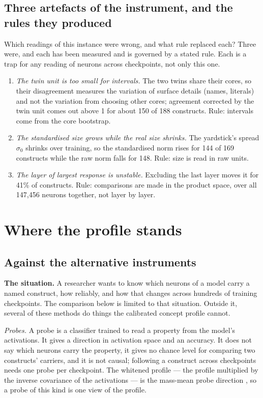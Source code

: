 \documentclass{article}
\begin{document}
\subsection{Three artefacts of the instrument, and the rules they produced}

Which readings of this instance were wrong, and what rule replaced each? Three were, and each has been measured and is governed by a stated rule. Each is a trap for any reading of neurons across checkpoints, not only this one.
\begin{enumerate}[topsep=2pt,itemsep=1pt,parsep=0pt,partopsep=0pt,leftmargin=*]
\item \emph{The twin unit is too small for intervals.} The two twins share their cores, so their disagreement measures the variation of surface details (names, literals) and not the variation from choosing other cores; agreement corrected by the twin unit comes out above 1 for about 150 of 188 constructs. Rule: intervals come from the core bootstrap.
\item \emph{The standardised size grows while the real size shrinks.} The yardstick's spread $\sigma$$_0$ shrinks over training, so the standardised norm rises for 144 of 169 constructs while the raw norm falls for 148. Rule: size is read in raw units.
\item \emph{The layer of largest response is unstable.} Excluding the last layer moves it for 41\% of constructs. Rule: comparisons are made in the product space, over all 147,456 neurons together, not layer by layer.
\end{enumerate}

\section{Where the profile stands}

\subsection{Against the alternative instruments}

\textbf{The situation.} A researcher wants to know which neurons of a model carry a named construct, how reliably, and how that changes across hundreds of training checkpoints. The comparison below is limited to that situation. Outside it, several of these methods do things the calibrated concept profile cannot.

\emph{Probes.} A probe is a classifier trained to read a property from the model's activations. It gives a direction in activation space and an accuracy. It does not say which neurons carry the property, it gives no chance level for comparing two constructs' carriers, and it is not causal; following a construct across checkpoints needs one probe per checkpoint. The whitened profile --- the profile multiplied by the inverse covariance of the activations --- is the mass-mean probe direction \citep{marks2023}, so a probe of this kind is one view of the profile.
\end{document}
